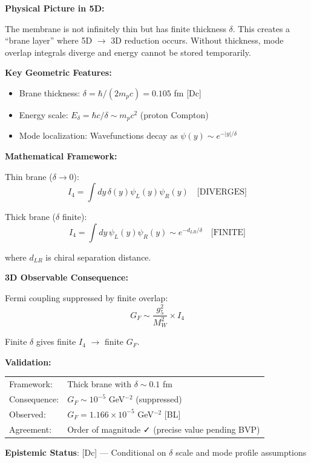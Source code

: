 
\begin{mdframed}[frametitle={\colorbox{white}{\textbf{5D Mechanism: Thick Brane Necessity}}},
                 linewidth=2pt,
                 linecolor=blue!75!black,
                 backgroundcolor=blue!5]

\textbf{Physical Picture in 5D:}

The membrane is not infinitely thin but has finite thickness $\delta$.
This creates a ``brane layer'' where 5D $\to$ 3D reduction occurs.
Without thickness, mode overlap integrals diverge and energy cannot be stored temporarily.

\textbf{Key Geometric Features:}
\begin{itemize}
\item Brane thickness: $\delta = \hbar/(2m_p c) = 0.105$ fm [Dc]
\item Energy scale: $E_\delta = \hbar c/\delta \sim m_p c^2$ (proton Compton)
\item Mode localization: Wavefunctions decay as $\psi(y) \sim e^{-|y|/\delta}$
\end{itemize}

\textbf{Mathematical Framework:}

Thin brane ($\delta \to 0$):
\begin{equation}
I_4 = \int dy\, \delta(y) \psi_L(y) \psi_R(y) \quad \text{[DIVERGES]}
\end{equation}

Thick brane ($\delta$ finite):
\begin{equation}
I_4 = \int dy\, \psi_L(y) \psi_R(y) \sim e^{-d_{LR}/\delta} \quad \text{[FINITE]}
\end{equation}

where $d_{LR}$ is chiral separation distance.

\textbf{3D Observable Consequence:}

Fermi coupling suppressed by finite overlap:
\begin{equation}
G_F \sim \frac{g_5^2}{M_W^2} \times I_4
\end{equation}

Finite $\delta$ gives finite $I_4$ $\to$ finite $G_F$.

\textbf{Validation:}

\begin{tabular}{ll}
Framework: & Thick brane with $\delta \sim 0.1$ fm \\
Consequence: & $G_F \sim 10^{-5}$ GeV$^{-2}$ (suppressed) \\
Observed: & $G_F = 1.166 \times 10^{-5}$ GeV$^{-2}$ [BL] \\
Agreement: & Order of magnitude ✓ (precise value pending BVP) \\
\end{tabular}

\textbf{Epistemic Status}: [Dc] — Conditional on $\delta$ scale and mode profile assumptions

\end{mdframed}

